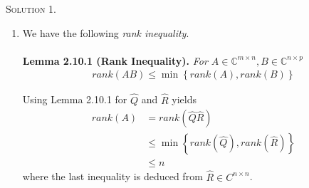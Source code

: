 \documentclass[a4paper,oneside]{book}
\numberwithin{equation}{chapter}
\begin{document}
\textsc{Solution 1.} 
\begin{enumerate}
\item We have the following \textit{rank inequality}.\\
\\
\textbf{Lemma 2.10.1 (Rank Inequality).} \textit{For $A \in {\mathbb{C}^{m \times n}},B \in {\mathbb{C}^{n \times p}}$}
\begin{align}
rank\left( {AB} \right) \le \min \left\{ {rank\left( A \right),rank\left( B \right)} \right\}
\end{align}

Using Lemma 2.10.1 for $\hat Q$ and $\hat R$ yields
\begin{align}
rank\left( A \right) &= rank\left( {\hat Q\hat R} \right)\\
 &\le \min \left\{ {rank\left( {\hat Q} \right),rank\left( {\hat R} \right)} \right\}\\
 &\le n
\end{align}
where the last inequality is deduced from $\hat R \in {C^{n \times n}}$. 


\end{enumerate}
\end{document}
